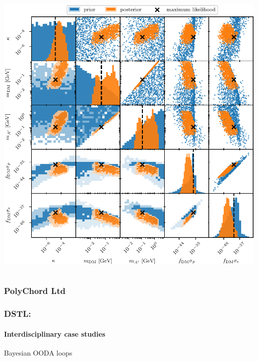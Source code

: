 \documentclass[aspectratio=169]{beamer}
\begin{document}
\begin{frame}
\begin{columns}
        \includegraphics[width=\textwidth]{figures/Bayes_SubGeVDM_fermion_RDprior_allDM_asym_observables.pdf}
    \end{columns}
\end{frame}

\begin{frame}
    \frametitle{PolyChord Ltd}

\end{frame}

\begin{frame}
    \frametitle{DSTL: }
    \framesubtitle{Interdisciplinary case studies}
    Bayesian OODA loops
\end{frame}
\end{document}
